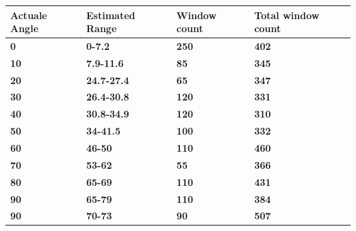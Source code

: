 \documentclass[12pt]{article}
\numberwithin{figure}{section}
\numberwithin{table}{section}
\begin{document}
\begin{table}[H]
\centering
\begin{tabular}{|m{}|m{}|m{}|m{}|} 
\hline
\bf {Actuale Angle} &  {\bf{ Estimated Range }} & {\bf{ Window count }} & {\bf{Total window count}}\\
\hline
\hline
\bf {0} &  {\bf{ 0-7.2  }} & {\bf{250 }} & {\bf{ 402 }}\\
\hline
\bf {10} &  {\bf{ 7.9-11.6 }} & {\bf{85 }} & {\bf{ 345 }}\\
\hline
\bf {20} &  {\bf{ 24.7-27.4 }} & {\bf{65 }} & {\bf{ 347 }}\\
\hline
\bf {30} &  {\bf{ 26.4-30.8 }} & {\bf{120 }} & {\bf{ 331 }}\\
\hline
\bf {40} &  {\bf{ 30.8-34.9 }} & {\bf{120 }} & {\bf{ 310 }}\\
\hline
\bf {50} &  {\bf{ 34-41.5 }} & {\bf{100 }} & {\bf{ 332 }}\\
\hline
\bf {60} &  {\bf{ 46-50}} & {\bf{ 110}} & {\bf{ 460 }}\\
\hline
\bf {70} &  {\bf{ 53-62 }} & {\bf{ 55 }} & {\bf{ 366}}\\
\hline
\bf {80} &  {\bf{ 65-69 }} & {\bf{ 110 }} & {\bf{ 431 }}\\
\hline
\bf {90} &  {\bf{ 65-79 }} & {\bf{ 110 }} & {\bf{ 384}}\\
\hline
\bf {90} &  {\bf{ 70-73 }} & {\bf{ 90 }} & {\bf{ 507}}\\
\hline
\end{tabular}
\end{table}
\end{document}
